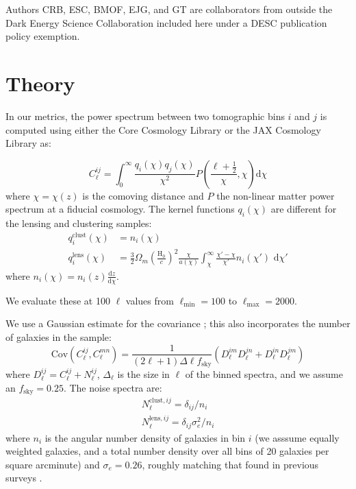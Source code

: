\documentclass[twocolumn,twocolappendix]{aastex63}
\begin{document}
Authors CRB, ESC, BMOF, EJG, and GT are collaborators from outside the
Dark Energy Science Collaboration included here under a DESC publication policy exemption.






\appendix

\section{Theory}\label{app:theory}

In our metrics, the power spectrum between two tomographic bins $i$ and $j$ is
computed using either the Core Cosmology Library \citep{ccl} or the JAX
Cosmology Library \citep{jax-cosmo} as:

\begin{equation}
    C^{ij}_\ell = \int_0^{\infty} \frac{q_i(\chi) q_j(\chi)}{\chi^2} P\left(\frac{\ell +\frac{1}{2}}{\chi}, \chi \right) \mathrm{d}\chi
\end{equation}
where $\chi = \chi(z)$ is the comoving distance and $P$ the non-linear matter power spectrum at
a fiducial cosmology.  The kernel functions $q_i(\chi)$ are different for the lensing and clustering samples:
\begin{align}
    q^{\mathrm{clust}}_i(\chi) &= n_i(\chi)\\
    q^{\mathrm{lens}}_i(\chi) &= \frac{3}{2}\Omega_m \left(\frac{\mathrm{H}_0}{c}\right)^2 \frac{\chi}{a(\chi)} \int_\chi^{\infty} \frac{\chi' - \chi}{\chi'} n_i(\chi')\,\,\mathrm{d}\chi'
\end{align}
where $n_i(\chi) = n_i(z) \frac{\mathrm{d}z}{\mathrm{d}\chi}$.

We evaluate these at 100 $\ell$ values from $\ell_\mathrm{min}=100$ to $\ell_\mathrm{max}=2000$.

We use a Gaussian estimate for the covariance \citep{takada_jain}; this also incorporates the number of galaxies in the
sample:
\begin{equation}
    \mathrm{Cov}(C^{ij}_\ell, C^{mn}_\ell) = \frac{1}{(2 \ell + 1)\Delta\ell f_\mathrm{sky}}(D^{im}_\ell  D^{jn}_\ell + D^{in}_\ell D^{jm}_\ell)
\end{equation}
where $D^{ij}_\ell = C^{ij}_\ell + N^{ij}_\ell$, $\Delta_\ell$ is the size in $\ell$ of the binned spectra, and we assume an $f_\mathrm{sky}=0.25$.  The noise spectra are:
\begin{align}
N^{\mathrm{clust},ij}_\ell = \delta_{ij} / n_i \\
N^{\mathrm{lens},ij}_\ell = \delta_{ij} \sigma_e^2 / n_i
\end{align}
where $n_i$ is the angular number density of galaxies in bin $i$ (we asssume equally weighted galaxies, and a 
total number density over all bins of 20 galaxies per square arcminute) and $\sigma_e=0.26$, roughly matching that found in previous surveys \citep{des,desy3a,desy3b,kids,hsc}.
\end{document}
